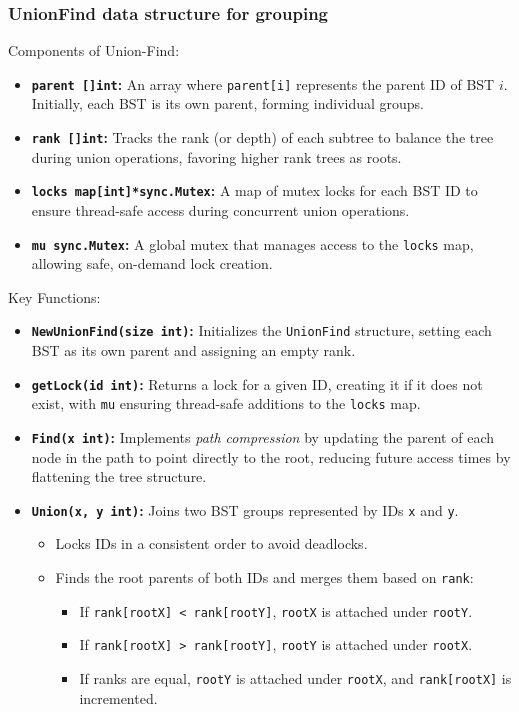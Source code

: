 \documentclass[letterpaper,12pt]{article}
\theoremstyle{remark}
\begin{document}
\subsubsection{UnionFind data structure for grouping}
Components of Union-Find:
\begin{itemize}
    \item \textbf{\texttt{parent []int}:} An array where \texttt{parent[i]} represents the parent ID of BST $i$. Initially, each BST is its own parent, forming individual groups.
    \item \textbf{\texttt{rank []int}:} Tracks the rank (or depth) of each subtree to balance the tree during union operations, favoring higher rank trees as roots.
    \item \textbf{\texttt{locks map[int]*sync.Mutex}:} A map of mutex locks for each BST ID to ensure thread-safe access during concurrent union operations.
    \item \textbf{\texttt{mu sync.Mutex}:} A global mutex that manages access to the \texttt{locks} map, allowing safe, on-demand lock creation.
\end{itemize}

Key Functions:
\begin{itemize}
    \item \textbf{\texttt{NewUnionFind(size int)}:} Initializes the \texttt{UnionFind} structure, setting each BST as its own parent and assigning an empty rank.
    
    \item \textbf{\texttt{getLock(id int)}:} Returns a lock for a given ID, creating it if it does not exist, with \texttt{mu} ensuring thread-safe additions to the \texttt{locks} map.
    
    \item \textbf{\texttt{Find(x int)}:} Implements \textit{path compression} by updating the parent of each node in the path to point directly to the root, reducing future access times by flattening the tree structure.
    
    \item \textbf{\texttt{Union(x, y int)}:} Joins two BST groups represented by IDs \texttt{x} and \texttt{y}.
    \begin{itemize}
        \item Locks IDs in a consistent order to avoid deadlocks.
        \item Finds the root parents of both IDs and merges them based on \texttt{rank}:
        \begin{itemize}
            \item If \texttt{rank[rootX] < rank[rootY]}, \texttt{rootX} is attached under \texttt{rootY}.
            \item If \texttt{rank[rootX] > rank[rootY]}, \texttt{rootY} is attached under \texttt{rootX}.
            \item If ranks are equal, \texttt{rootY} is attached under \texttt{rootX}, and \texttt{rank[rootX]} is incremented.
        \end{itemize}
    \end{itemize}
\end{itemize}
\end{document}
